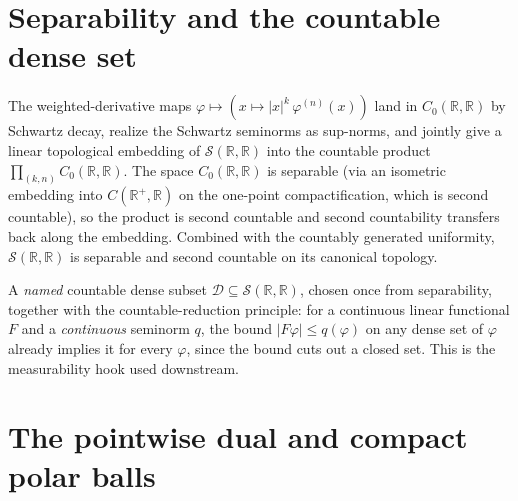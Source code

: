 \section{Separability and the countable dense set}

\begin{theorem}\label{thm:mit-separable}
  \leanok
  The weighted-derivative maps $\varphi \mapsto (x \mapsto |x|^k \, \varphi^{(n)}(x))$ land in
  $C_0(\mathbb{R},\mathbb{R})$ by Schwartz decay, realize the Schwartz seminorms as sup-norms, and
  jointly give a linear topological embedding of $\mathcal{S}(\mathbb{R},\mathbb{R})$ into the
  countable product $\prod_{(k,n)} C_0(\mathbb{R},\mathbb{R})$.  The space
  $C_0(\mathbb{R},\mathbb{R})$ is separable (via an isometric embedding into
  $C(\mathbb{R}^+,\mathbb{R})$ on the one-point compactification, which is second countable), so the
  product is second countable and second countability transfers back along the embedding.  Combined
  with the countably generated uniformity, $\mathcal{S}(\mathbb{R},\mathbb{R})$ is separable and
  second countable on its canonical topology.
\end{theorem}

\begin{definition}\label{def:mit-dense-set}
  \leanok
  A \emph{named} countable dense subset $\mathcal{D} \subseteq \mathcal{S}(\mathbb{R},\mathbb{R})$,
  chosen once from separability, together with the countable-reduction principle: for a continuous
  linear functional $F$ and a \emph{continuous} seminorm $q$, the bound $|F\varphi| \le q(\varphi)$
  on any dense set of $\varphi$ already implies it for every $\varphi$, since the bound cuts out a
  closed set.  This is the measurability hook used downstream.
\end{definition}

\section{The pointwise dual and compact polar balls}


